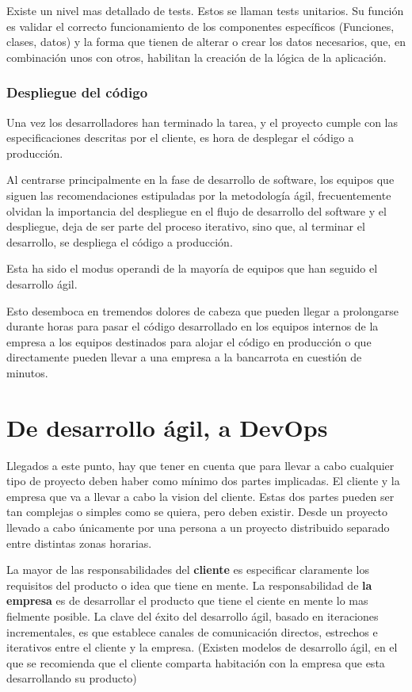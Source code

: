 \documentclass[12pt]{report} %
\begin{document}
Existe un nivel mas detallado de tests.  Estos se llaman tests unitarios.  Su
función es validar el correcto funcionamiento de los componentes específicos
(Funciones, clases, datos) y la forma  que tienen de alterar o crear los datos
necesarios, que, en combinación unos con otros, habilitan la creación de la
lógica de la aplicación.

\subsubsection{Despliegue del código}

Una vez los desarrolladores han terminado la tarea, y el proyecto cumple con las
especificaciones descritas por el cliente, es hora de desplegar el código a
producción.

Al centrarse principalmente en la fase de desarrollo de software, los equipos
que siguen las recomendaciones estipuladas por la metodología ágil,
frecuentemente olvidan la importancia del despliegue en el flujo de desarrollo
del software y el despliegue, deja de ser parte del proceso iterativo, sino que,
al terminar el desarrollo, se despliega el código a producción.

Esta ha sido el modus operandi de la mayoría de equipos que han seguido el
desarrollo ágil.

Esto desemboca en tremendos dolores de cabeza que pueden llegar a prolongarse
durante horas para pasar el código desarrollado en los equipos internos de la
empresa a los equipos destinados para alojar el código en producción o que
directamente pueden llevar a una empresa a la bancarrota en cuestión de minutos.
\cite{seven2014}

\section{De desarrollo ágil, a DevOps}

Llegados a este punto, hay que tener en cuenta que para llevar a cabo cualquier
tipo de proyecto deben haber como mínimo dos partes implicadas.  El cliente y la
empresa que va a llevar a cabo la vision del cliente.  Estas dos partes pueden
ser tan complejas o simples como se quiera, pero deben existir.  Desde un
proyecto llevado a cabo únicamente por una persona a un proyecto distribuido
separado entre distintas zonas horarias.

La mayor de las responsabilidades del \textbf{cliente} es especificar claramente
los requisitos del producto o idea que tiene en mente.  La responsabilidad de
\textbf{la empresa} es de desarrollar el producto que tiene el ciente en mente
lo mas fielmente posible.  La clave del éxito del desarrollo ágil, basado en
iteraciones incrementales, es que establece canales de comunicación directos,
estrechos e iterativos entre el cliente y la empresa.  (Existen modelos de
desarrollo ágil, en el que se recomienda que el cliente comparta habitación con
la empresa que esta desarrollando su producto)
\end{document}
